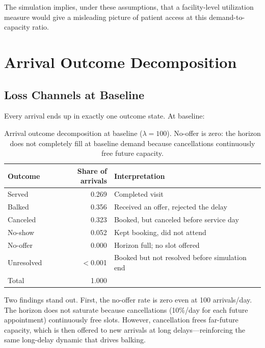 \documentclass[11pt]{article}
\begin{document}
The simulation implies, under these assumptions, that a facility-level
utilization measure would give a misleading picture of patient access at
this demand-to-capacity ratio.

\section{Arrival Outcome Decomposition}
\label{sec:decomp}

\subsection{Loss Channels at Baseline}

Every arrival ends up in exactly one outcome state. At baseline:

\begin{table}[H]
\centering
\renewcommand{\arraystretch}{1.12}
\begin{tabular}{lrp{}}
\toprule
Outcome & Share of arrivals & Interpretation \\
\midrule
Served & 0.269 & Completed visit \\
Balked & 0.356 & Received an offer, rejected the delay \\
Canceled & 0.323 & Booked, but canceled before service day \\
No-show & 0.052 & Kept booking, did not attend \\
No-offer & 0.000 & Horizon full; no slot offered \\
Unresolved & $<$0.001 & Booked but not resolved before simulation end \\
\midrule
Total & 1.000 & \\
\bottomrule
\end{tabular}
\caption{Arrival outcome decomposition at baseline ($\lambda = 100$).
No-offer is zero: the horizon does not completely fill at baseline demand
because cancellations continuously free future capacity.}
\label{tab:decomp}
\end{table}

Two findings stand out. First, the no-offer rate is zero even at 100
arrivals/day. The horizon does not saturate because cancellations
(10\%/day for each future appointment) continuously free slots. However,
cancellation frees far-future capacity, which is then offered to new
arrivals at long delays---reinforcing the same long-delay dynamic that
drives balking.
\end{document}
